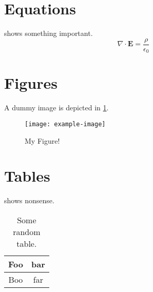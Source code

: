 \documentclass{article}
\begin{document}
\section{Equations}
 shows something important. 
\begin{equation}
    \nabla \cdot \mathbf{E} = \frac{\rho}{\epsilon_0} \label{eq:maxwell}
\end{equation}

\section{Figures}
A dummy image is depicted in \cref{fig:example}.
\begin{figure}[h]
    \centering
    \texttt{[image: example-image]}
    \caption{
        My Figure!
    }\label{fig:example}
\end{figure}

\section{Tables}
 shows nonsense.
\begin{table}[h]
    \centering
    \begin{tabular}{cc}
        \toprule
        Foo & bar \\
        \midrule
        Boo & far \\
        \bottomrule
    \end{tabular}
    \caption{
        Some random table.
    }\label{tab:foo}
\end{table}
\end{document}
